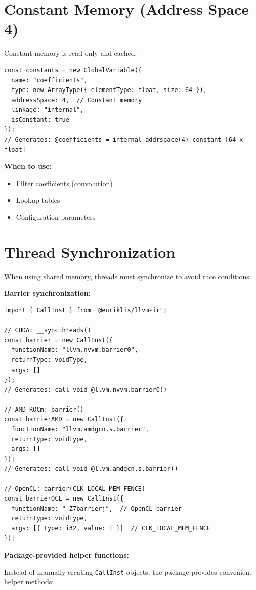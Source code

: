 \documentclass[11pt,oneside]{book}
\begin{document}
\section{Constant Memory (Address Space 4)}

Constant memory is read-only and cached:

\begin{lstlisting}[style=ts]
const constants = new GlobalVariable({
  name: "coefficients",
  type: new ArrayType({ elementType: float, size: 64 }),
  addressSpace: 4,  // Constant memory
  linkage: "internal",
  isConstant: true
});
// Generates: @coefficients = internal addrspace(4) constant [64 x float]
\end{lstlisting}

\textbf{When to use:}
\begin{itemize}[noitemsep]
  \item Filter coefficients (convolution)
  \item Lookup tables
  \item Configuration parameters
\end{itemize}

\section{Thread Synchronization}

When using shared memory, threads must synchronize to avoid race conditions.

\textbf{Barrier synchronization:}
\begin{lstlisting}[style=ts]
import { CallInst } from "@euriklis/llvm-ir";

// CUDA: __syncthreads()
const barrier = new CallInst({
  functionName: "llvm.nvvm.barrier0",
  returnType: voidType,
  args: []
});
// Generates: call void @llvm.nvvm.barrier0()

// AMD ROCm: barrier()
const barrierAMD = new CallInst({
  functionName: "llvm.amdgcn.s.barrier",
  returnType: voidType,
  args: []
});
// Generates: call void @llvm.amdgcn.s.barrier()

// OpenCL: barrier(CLK_LOCAL_MEM_FENCE)
const barrierOCL = new CallInst({
  functionName: "_Z7barrierj",  // OpenCL barrier
  returnType: voidType,
  args: [{ type: i32, value: 1 }]  // CLK_LOCAL_MEM_FENCE
});
\end{lstlisting}

\textbf{Package-provided helper functions:}

Instead of manually creating \texttt{CallInst} objects, the package provides convenient helper methods:
\end{document}
